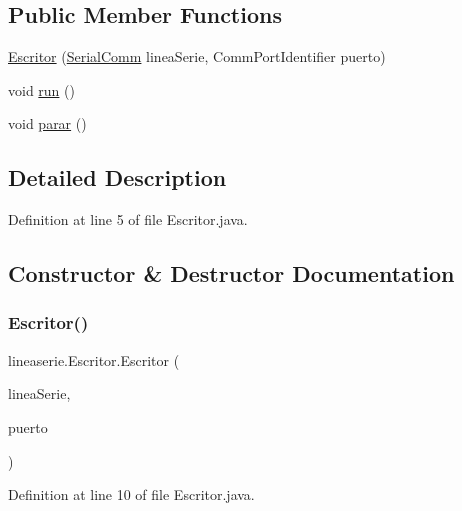 \subsection*{Public Member Functions}
\begin{DoxyCompactItemize}
\item 
\mbox{\hyperlink{classlineaserie_1_1_escritor_a0469893e8a8e4548e89ead10694676db}{Escritor}} (\mbox{\hyperlink{classlineaserie_1_1_serial_comm}{Serial\+Comm}} linea\+Serie, Comm\+Port\+Identifier puerto)
\item 
void \mbox{\hyperlink{classlineaserie_1_1_escritor_a510a437d7f0ed6a89fb326b6d03e4d6c}{run}} ()
\item 
void \mbox{\hyperlink{classlineaserie_1_1_escritor_acd4e96fe60f601259643fa12d15b5387}{parar}} ()
\end{DoxyCompactItemize}


\subsection{Detailed Description}


Definition at line 5 of file Escritor.\+java.



\subsection{Constructor \& Destructor Documentation}
\mbox{\label{classlineaserie_1_1_escritor_a0469893e8a8e4548e89ead10694676db}} 
\subsubsection{\texorpdfstring{Escritor()}{Escritor()}}
{\footnotesize\ttfamily lineaserie.\+Escritor.\+Escritor (\begin{DoxyParamCaption}\item[{\mbox{\hyperlink{classlineaserie_1_1_serial_comm}{Serial\+Comm}}}]{linea\+Serie,  }\item[{Comm\+Port\+Identifier}]{puerto }\end{DoxyParamCaption})}



Definition at line 10 of file Escritor.\+java.



